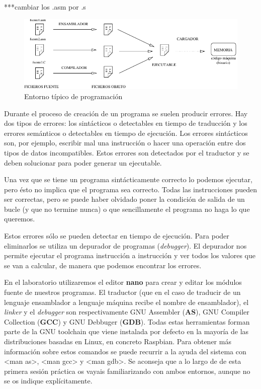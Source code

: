 ***cambiar los .asm por .s
\begin{figure}[h]
  \centering
    \includegraphics[width=13cm]{graphs/ensamblado.pdf}
  \caption{Entorno típico de programación}
  \label{fig:entorno}
\end{figure}

Durante el proceso de creación de un programa se suelen producir errores.
Hay dos tipos de errores: los sintácticos o detectables en tiempo de
traducción y los errores semánticos o detectables en tiempo de ejecución.
Los errores sintácticos son, por ejemplo, escribir mal una instrucción o
hacer una operación entre dos tipos de datos incompatibles.
Estos errores son detectados por el traductor y se deben solucionar para
poder generar un ejecutable.

Una vez que se tiene un programa sintácticamente correcto lo podemos
ejecutar, pero ésto no implica que el programa sea correcto. Todas las
instrucciones pueden ser correctas, pero se puede haber olvidado poner la
condición de salida de un bucle (y que no termine nunca) o que
sencillamente el programa no haga lo que queremos.

Estos errores sólo se pueden detectar en tiempo de ejecución.
Para poder eliminarlos se utiliza un depurador de programas ({\it debugger}).
El depurador nos permite ejecutar el programa instrucción a instrucción y
ver todos los valores que se van a calcular, de manera que podemos encontrar
los errores.

En el laboratorio utilizaremos el editor {\bf nano} para crear
y editar los módulos fuente de nuestros programas. El traductor
(que en el caso de traducir de un lenguaje ensamblador a lenguaje máquina
recibe el nombre de ensamblador), el {\it linker} y el {\it debugger} son
respectivamente GNU Assembler ({\bf AS}), GNU Compiler Collection ({\bf GCC})
y GNU Debbuger ({\bf GDB}). Todas estas herramientas forman parte de la
GNU toolchain que viene instalada por defecto en la mayoría de las distribuciones
basadas en Linux, en concreto Raspbian. Para obtener más información sobre estos
comandos se puede recurrir a la ayuda del sistema con <man as>, <man gcc> y
<man gdb>. Se aconseja que a lo largo de de esta
primera sesión práctica os vayais familiarizando con ambos entornos,
aunque no se os indique explícitamente.

